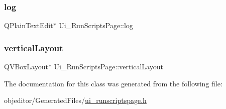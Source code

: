 \mbox{\label{class_ui___run_scripts_page_a150bdfd9bff55c40e653b883f9317d7b}} 
\subsubsection{\texorpdfstring{log}{log}}
{\footnotesize\ttfamily Q\+Plain\+Text\+Edit$\ast$ Ui\+\_\+\+Run\+Scripts\+Page\+::log}

\mbox{\label{class_ui___run_scripts_page_a433553759077c25cddb9e13fa16671b9}} 
\subsubsection{\texorpdfstring{verticalLayout}{verticalLayout}}
{\footnotesize\ttfamily Q\+V\+Box\+Layout$\ast$ Ui\+\_\+\+Run\+Scripts\+Page\+::vertical\+Layout}



The documentation for this class was generated from the following file\+:\begin{DoxyCompactItemize}
\item 
objeditor/\+Generated\+Files/\mbox{\hyperlink{ui__runscriptspage_8h}{ui\+\_\+runscriptspage.\+h}}\end{DoxyCompactItemize}
